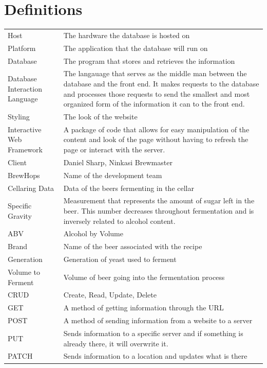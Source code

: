 \documentclass[draftclsnofoot,onecolumn,letterpaper,10pt]{IEEEtran}
\begin{document}
\section{Definitions}
\begin{longtable}{p{4cm}p{12cm}}
    Host & The hardware the database is hosted on \\
    Platform & The application that the database will run on \\
    Database & The program that stores and retrieves the information \\
    Database Interaction Language & The langauage that serves as the middle man between the database and the front end. It makes requests to the database and processes those requests to send the smallest and most organized form of the information it can to the front end. \\
    Styling & The look of the website \\
    Interactive Web Framework & A package of code that allows for easy manipulation of the content and look of the page without having to refresh the page or interact with the server. \\
    Client & Daniel Sharp, Ninkasi Brewmaster \\
    BrewHops & Name of the development team \\
    Cellaring Data & Data of the beers fermenting in the cellar \\
    Specific Gravity & Measurement that represents the amount of sugar left in the beer. This number decreases throughout fermentation and is inversely related to alcohol content. \\
    ABV & Alcohol by Volume \\
    Brand & Name of the beer associated with the recipe \\
    Generation & Generation of yeast used to ferment \\
    Volume to Ferment & Volume of beer going into the fermentation process \\
    CRUD & Create, Read, Update, Delete \\
    GET & A method of getting information through the URL \\
    POST & A method of sending information from a website to a server \\
    PUT & Sends information to a specific server and if something is already there, it will overwrite it. \\
    PATCH & Sends information to a location and updates what is there \\

\end{longtable}
\end{document}
